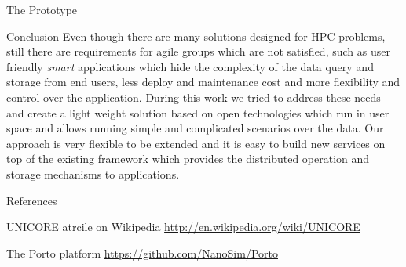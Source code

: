 \documentclass[final,hyperref={pdfpagelabels=true}]{beamer}
\newenvironment{postit}
{\begin{beamercolorbox}[sep=1em,wd=7cm]{postit}}
{\end{beamercolorbox}}
\begin{document}
\begin{frame}
\begin{columns}[t]
\begin{column}{.45\textwidth}
      \begin{block}{The Prototype}
      \end{block}
	  \begin{block}{Conclusion}
	  Even though there are many solutions designed for HPC problems, still there are requirements for agile groups which are not satisfied, such as user friendly \textit{smart} applications which hide the complexity
	  of the data query and storage from end users, less deploy and maintenance cost and more flexibility and control over the application.
	  During this work we tried to address these needs and create a light weight
	  solution based on open technologies which run in user space and allows running simple and complicated scenarios over the data. Our approach is very flexible to be extended and it is easy to build new services on top
	  of the existing framework which provides the distributed operation and storage mechanisms to applications.
	  \end{block}
      \begin{block}{References}
        \begin{thebibliography}{999}
        UNICORE atrcile on Wikipedia
        \url{http://en.wikipedia.org/wiki/UNICORE}
        
        The Porto platform
        \url{https://github.com/NanoSim/Porto}
%          
          
        \end{thebibliography}
      \end{block}
    \end{column}
  \end{columns}

  
\end{frame}
\end{document}
